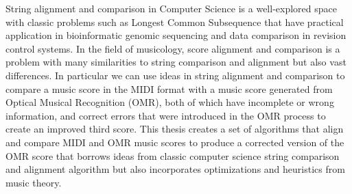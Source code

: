 % 
% 
%
String alignment and comparison in Computer Science is a well-explored space with classic problems such as Longest Common Subsequence that have practical application in bioinformatic genomic sequencing and data comparison in revision control systems. In the field of musicology, score alignment and comparison is a problem with many similarities to string comparison and alignment but also vast differences. In particular we can use ideas in string alignment and comparison to compare a music score in the MIDI format with a music score generated from Optical Musical Recognition (OMR), both of which have incomplete or wrong information, and correct errors that were introduced in the OMR process to create an improved third score. This thesis creates a set of algorithms that align and compare MIDI and OMR music scores to produce a corrected version of the OMR score that borrows ideas from classic computer science string comparison and alignment algorithm but also incorporates optimizations and heuristics from music theory. 
